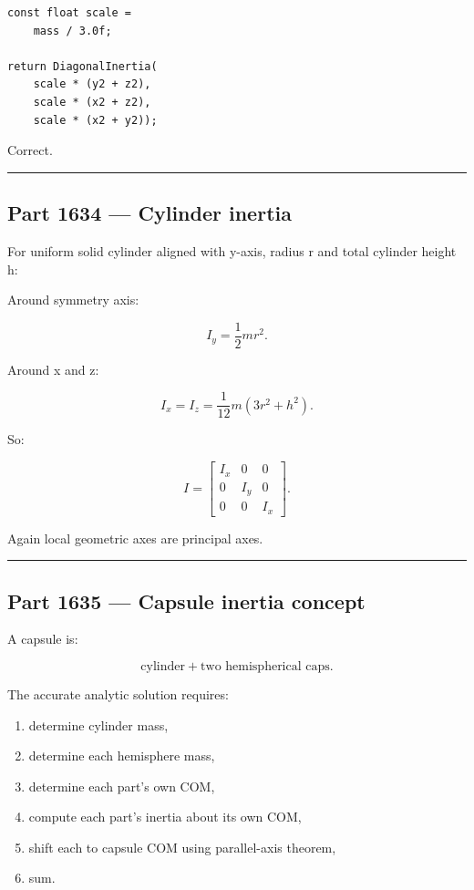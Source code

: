\begin{verbatim}
const float scale =
    mass / 3.0f;

return DiagonalInertia(
    scale * (y2 + z2),
    scale * (x2 + z2),
    scale * (x2 + y2));
\end{verbatim}

Correct.

\begin{center}\rule{0.5\linewidth}{0.5pt}\end{center}

\subsection{Part 1634 --- Cylinder inertia}\label{06-engine-ii-ch035-part-1634-cylinder-inertia}

For uniform solid cylinder aligned with y-axis, radius r and total cylinder height h:

Around symmetry axis:

\[
\boxed{
I_y
=
\frac12mr^2.
}
\]

Around x and z:

\[
\boxed{
I_x=I_z
=
\frac{1}{12}
m(3r^2+h^2).
}
\]

So:

\[
I=
\begin{bmatrix}
I_x&0&0\\
0&I_y&0\\
0&0&I_x
\end{bmatrix}.
\]

Again local geometric axes are principal axes.

\begin{center}\rule{0.5\linewidth}{0.5pt}\end{center}

\subsection{Part 1635 --- Capsule inertia concept}\label{06-engine-ii-ch035-part-1635-capsule-inertia-concept}

A capsule is:

\[
\text{cylinder}
+
\text{two hemispherical caps}.
\]

The accurate analytic solution requires:

\begin{enumerate}
\def\labelenumi{\arabic{enumi}.}
\tightlist
\item
  determine cylinder mass,
\item
  determine each hemisphere mass,
\item
  determine each part's own COM,
\item
  compute each part's inertia about its own COM,
\item
  shift each to capsule COM using parallel-axis theorem,
\item
  sum.
\end{enumerate}

